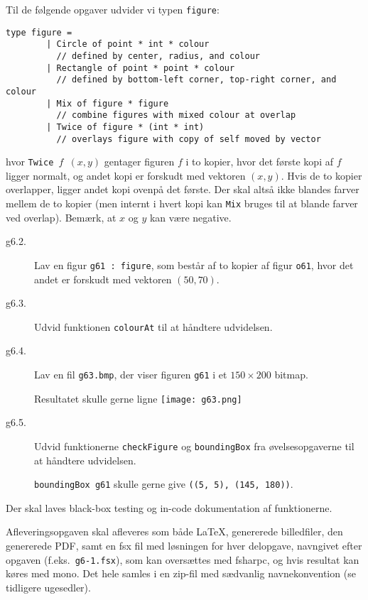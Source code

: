 \documentclass[a4paper]{article}
\begin{document}
\noindent
Til de følgende opgaver udvider vi typen \texttt{figure}:

\begin{verbatim}
type figure =
        | Circle of point * int * colour
          // defined by center, radius, and colour
        | Rectangle of point * point * colour
          // defined by bottom-left corner, top-right corner, and colour
        | Mix of figure * figure
          // combine figures with mixed colour at overlap
        | Twice of figure * (int * int)
          // overlays figure with copy of self moved by vector
\end{verbatim}

\noindent
hvor \texttt{Twice $f$ $(x,y)$} gentager figuren $f$ i to kopier, hvor
det første kopi af $f$ ligger normalt, og andet kopi er forskudt med
vektoren $(x,y)$.  Hvis de to kopier overlapper, ligger andet kopi
ovenpå det første.  Der skal altså ikke blandes farver mellem de to
kopier (men internt i hvert kopi kan \texttt{Mix} bruges til at blande
farver ved overlap).  Bemærk, at $x$ og $y$ kan være negative.

\begin{description}

\item[g6.2.] Lav en figur \texttt{g61 : figure}, som består
  af to kopier af figur \texttt{o61}, hvor det andet er forskudt med
  vektoren $(50,70)$.

\item[g6.3.] Udvid funktionen \texttt{colourAt} til at håndtere
  udvidelsen.

\item[g6.4.] Lav en fil \texttt{g63.bmp}, der viser figuren
  \texttt{g61} i et $150×200$ bitmap.

Resultatet skulle gerne ligne \texttt{[image: g63.png]}

\item[g6.5.] Udvid funktionerne \texttt{checkFigure} og
  \texttt{boundingBox} fra øvelsesopgaverne til at håndtere
  udvidelsen.

  \texttt{boundingBox g61} skulle gerne give \texttt{((5, 5), (145,
    180))}.

\end{description}

\noindent
Der skal laves black-box testing og in-code dokumentation af
funktionerne.

\vspace{1ex}

\noindent
Afleveringsopgaven skal afleveres som både \LaTeX, genererede
billedfiler, den genererede PDF, samt en fsx fil med løsningen for
hver delopgave, navngivet efter opgaven (f.eks.\ \texttt{g6-1.fsx}),
som kan oversættes med fsharpc, og hvis resultat kan køres med mono.
Det hele samles i en zip-fil med sædvanlig navnekonvention (se
tidligere ugesedler).
\end{document}
